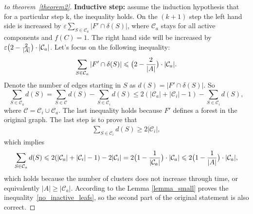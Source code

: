 \documentclass[12pt]{article}
\newtheorem{proof}{Proof}
\begin{document}
\begin{proof}[to theorem~\ref{theorem2}]
    \textbf{Inductive step:} assume the induction hypothesis that for a particular step k, the inequality holds. On the $(k+1)$ step the left hand side is increased by $\varepsilon\sum\limits_{S\in\mathcal{C}_a}|F'\cap \delta(S)|$, where $\mathcal{C}_a$ stays for all active components and  $f(C)=1$. The right hand side will be increased by $\varepsilon\bigl( 2 - \frac{2}{|A|}\bigr)\cdot|\mathcal{C}_a|$. Let's focus on the following inequality:
     \[
    \sum\limits_{S\in\mathcal{C}_a}|F'\cap \delta(S)|\leqslant\bigl( 2 - \frac{2}{|A|}\bigr)\cdot|\mathcal{C}_a|.
     \]
    Denote the number of edges starting in $S$ as $d(S) = |F'\cap \delta(S)|$. So
     \[
    \sum\limits_{S\in\mathcal{C}_a}d(S) = \sum\limits_{S\in\mathcal{C}}d(S) - \sum\limits_{S\in\mathcal{C}_i}d(S) \leqslant 2(|\mathcal{C}_a| + |\mathcal{C}_i| -1) - \sum\limits_{S\in\mathcal{C}_i}d(S),
     \]
    where $\mathcal{C} = \mathcal{C}_i\cup \mathcal{C}_a$. The last inequality holds because $F'$ defines a forest in the original graph. The last step is to prove that
    \begin{align}
    \sum\limits_{S\in\mathcal{C}_i}d(S)\geqslant 2|\mathcal{C}_i|,
    \label{no_inactive_leafs}
    \end{align}
    which implies
     \[
    \sum\limits_{S\in\mathcal{C}_a}d(S) \leqslant 2(|\mathcal{C}_a| + |\mathcal{C}_i| -1) - 2|\mathcal{C}_i| = 2\bigl( 1 - \frac{1}{|\mathcal{C}_a|}\bigr)\cdot|\mathcal{C}_a|\leqslant2\bigl( 1 - \frac{1}{|A|}\bigr)\cdot|\mathcal{C}_a|,
     \]
     which holds because the number of clusters does not increase through time, or equivalently $|A| \geqslant |\mathcal{C}_a|$.
    According to the Lemma \ref{lemma_small} proves the inequality~\eqref{no_inactive_leafs}, so the second part of the original statement is also correct.
\end{proof}
\end{document}
